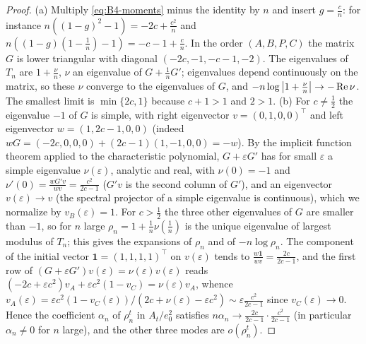 \begin{proof}
(a) Multiply \eqref{eq:B4-moments} minus the identity by $n$ and insert $g=\frac cn$: for instance $n((1-g)^2-1)=-2c+\frac{c^2}n$ and $n((1-g)(1-\frac1n)-1)=-c-1+\frac cn$. In the order $(A,B,P,C)$ the matrix $G$ is lower triangular with diagonal $(-2c,-1,-c-1,-2)$. The eigenvalues of $T_n$ are $1+\frac{\nu}n$, $\nu$ an eigenvalue of $G+\frac1nG'$; eigenvalues depend continuously on the matrix, so these $\nu$ converge to the eigenvalues of $G$, and $-n\log\left|1+\frac\nu n\right|\to-\operatorname{Re}\nu$. The smallest limit is $\min\{2c,1\}$ because $c+1>1$ and $2>1$.
(b) For $c\ne\frac12$ the eigenvalue $-1$ of $G$ is simple, with right eigenvector $v=(0,1,0,0)^\top$ and left eigenvector $w=(1,2c-1,0,0)$ (indeed $wG=(-2c,0,0,0)+(2c-1)(1,-1,0,0)=-w$). By the implicit function theorem applied to the characteristic polynomial, $G+\varepsilon G'$ has for small $\varepsilon$ a simple eigenvalue $\nu(\varepsilon)$, analytic and real, with $\nu(0)=-1$ and $\nu'(0)=\frac{wG'v}{wv}=\frac{c^2}{2c-1}$ ($G'v$ is the second column of $G'$), and an eigenvector $v(\varepsilon)\to v$ (the spectral projector of a simple eigenvalue is continuous), which we normalize by $v_B(\varepsilon)=1$. For $c>\frac12$ the three other eigenvalues of $G$ are smaller than $-1$, so for $n$ large $\rho_n=1+\frac1n\nu(\frac1n)$ is the unique eigenvalue of largest modulus of $T_n$; this gives the expansions of $\rho_n$ and of $-n\log\rho_n$. The component of the initial vector $\mathbf 1=(1,1,1,1)^\top$ on $v(\varepsilon)$ tends to $\frac{w\mathbf 1}{wv}=\frac{2c}{2c-1}$, and the first row of $(G+\varepsilon G')v(\varepsilon)=\nu(\varepsilon)v(\varepsilon)$ reads $(-2c+\varepsilon c^2)v_A+\varepsilon c^2(1-v_C)=\nu(\varepsilon)v_A$, whence $v_A(\varepsilon)=\varepsilon c^2(1-v_C(\varepsilon))/(2c+\nu(\varepsilon)-\varepsilon c^2)\sim\varepsilon\frac{c^2}{2c-1}$ since $v_C(\varepsilon)\to0$. Hence the coefficient $\alpha_n$ of $\rho_n^t$ in $A_t/e_0^2$ satisfies $n\alpha_n\to\frac{2c}{2c-1}\cdot\frac{c^2}{2c-1}$ (in particular $\alpha_n\ne0$ for $n$ large), and the other three modes are $o(\rho_n^t)$.
\end{proof}

